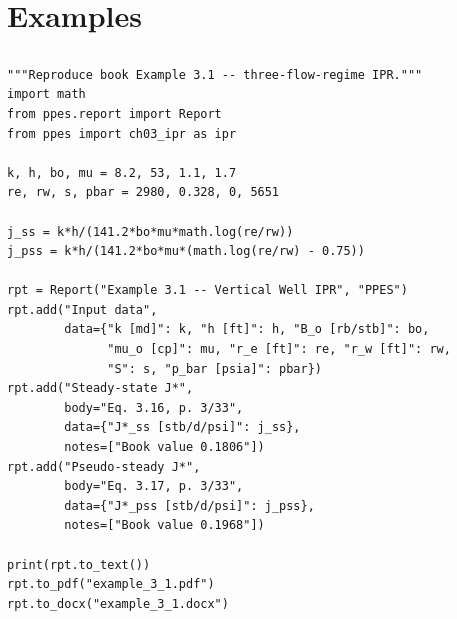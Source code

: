 \documentclass[10pt,a4paper,openany]{book}
\begin{document}
\part{Examples}

\chapter{}
\begin{lstlisting}
"""Reproduce book Example 3.1 -- three-flow-regime IPR."""
import math
from ppes.report import Report
from ppes import ch03_ipr as ipr

k, h, bo, mu = 8.2, 53, 1.1, 1.7
re, rw, s, pbar = 2980, 0.328, 0, 5651

j_ss = k*h/(141.2*bo*mu*math.log(re/rw))
j_pss = k*h/(141.2*bo*mu*(math.log(re/rw) - 0.75))

rpt = Report("Example 3.1 -- Vertical Well IPR", "PPES")
rpt.add("Input data",
        data={"k [md]": k, "h [ft]": h, "B_o [rb/stb]": bo,
              "mu_o [cp]": mu, "r_e [ft]": re, "r_w [ft]": rw,
              "S": s, "p_bar [psia]": pbar})
rpt.add("Steady-state J*",
        body="Eq. 3.16, p. 3/33",
        data={"J*_ss [stb/d/psi]": j_ss},
        notes=["Book value 0.1806"])
rpt.add("Pseudo-steady J*",
        body="Eq. 3.17, p. 3/33",
        data={"J*_pss [stb/d/psi]": j_pss},
        notes=["Book value 0.1968"])

print(rpt.to_text())
rpt.to_pdf("example_3_1.pdf")
rpt.to_docx("example_3_1.docx")
\end{lstlisting}
\end{document}
